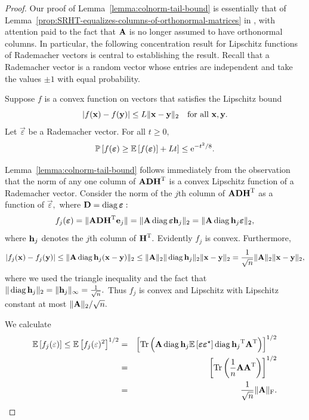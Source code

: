 \begin{proof}
Our proof of Lemma~\ref{lemma:colnorm-tail-bound} is essentially that of Lemma~\ref{prop:SRHT-equalizes-columns-of-orthonormal-matrices} in \cite{Tro11}, with attention paid to the fact that ${\bm{\mathrm{A}}}$ is no longer assumed to have orthonormal columns. In particular, the following concentration result for Lipschitz functions of Rademacher vectors is central to establishing the result.
Recall that a Rademacher vector is a random vector whose entries are independent and take the values $\pm 1$ with equal probability.

\begin{lemma}
\label{prop:rademacher-concentration}
 Suppose $f$ is a convex function on vectors that satisfies the Lipschitz bound
\[
 |f({\mathbf x}) - f({\mathbf y})| \leq L \mbox{}\|{\mathbf x} - {\mathbf y}\|_2 \quad \text{for all ${\mathbf x}, {\mathbf y}$.}
\]
Let $\vec{\varepsilon}$ be a Rademacher vector. For all $t \geq 0,$
\[
 \mbox{}{\mathbb{P}}\left[f(\bm{\varepsilon}) \geq \mbox{}{\mathbb{E}}\left[f(\bm{\varepsilon})\right] + Lt\right] \leq {\mathrm e}^{-t^2/8}.
\]
\end{lemma}
Lemma~\ref{lemma:colnorm-tail-bound} follows immediately from the observation that the norm of any one column of ${\bm{\mathrm{A}}} {\bm{\mathrm{D}}} {\bm{\mathrm{H}}} ^{\textsc{T}}$ is a convex Lipschitz function of a Rademacher vector.
Consider the norm of the $j$th column of ${\bm{\mathrm{A}}} {\bm{\mathrm{D}}} {\bm{\mathrm{H}}} ^{\textsc{T}}$ as a function of $\vec{\varepsilon},$ where $\matD = \diag{\vec{\varepsilon}}:$
\[
 f_j(\mat{\varepsilon}) = \|\matA \matD \matH \transp \e_j\| = \TNorm{\matA \diag{\vec{\varepsilon}} \h_j} = \TNorm{\matA \diag{\h_j} \vec{\varepsilon}},
\]
where ${\mathbf h}_j$ denotes the $j$th column of ${\bm{\mathrm{H}}} ^{\textsc{T}}.$
Evidently $f_j$ is convex. Furthermore,
\[
 |f_j(\x) - f_j(\y)| \leq \TNorm{\matA \diag{\h_j} (\x - \y)} \leq \TNorm{\matA} \TNorm{\diag{\h_j}} \TNorm{\x - \y} = \frac{1}{\sqrt{n}} \TNorm{\matA} \TNorm{\x - \y},
\]
where we used the triangle inequality and the fact that $\TNorm{\diag{\h_j}} = \INorm{\h_j} = \frac{1}{\sqrt{n}}.$ Thus $f_j$ is convex and Lipschitz with Lipschitz constant at most $\mbox{}\|{\bm{\mathrm{A}}}\|_2/\sqrt{n}.$

We calculate
\begin{eqnarray*}
 \Expect{f_j(\varepsilon)} \leq \Expect{ f_j(\varepsilon)^2}^{1/2}
 &=& \left[ \Trace{\matA \diag{\h_j} \Expect{\vec{\varepsilon} \vec{\varepsilon}^\star} \diag{\h_j} \transp \matA \transp} \right]^{1/2}\\
 &=& \left[\Trace{\frac{1}{n} \matA\matA \transp} \right]^{1/2} \\
 &=& \frac{1}{\sqrt{n}} \FNorm{\matA}.
\end{eqnarray*}


\end{proof}
